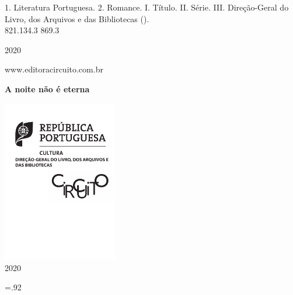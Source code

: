 {\begin{Parskip}
1. Literatura Portuguesa. 2. Romance. I. Título. II. Série. III. Direção-Geral do Livro, dos Arquivos e das Bibliotecas ().\\
 821.134.3 \quad {} 869.3

\vspace*{\fill}

2020

www.editoracircuito.com.br
\end{Parskip}

\pagebreak
\begin{flushright}
 
\vspace*{5cm}

\huge{\textbf{A noite não é eterna}} \hspace*{1.25cm}

\LARGE{} \hspace*{2.82cm}


\vfill
\hfill\includegraphics[width=5cm]{logos.pdf}\\ \normalsize{2020}
\par\end{flushright}\clearpage
\begingroup \footnotesize \parindent0pt \parskip 5pt \thispagestyle{empty} \vspace*{.25\textheight}\mbox{} \vfill
\baselineskip=.92\baselineskip
{}
\thispagestyle{empty} \endgroup
\ifdefvoid{\sobreautor}{}{\pagebreak\ifodd\thepage\paginabranca\fi}

}
